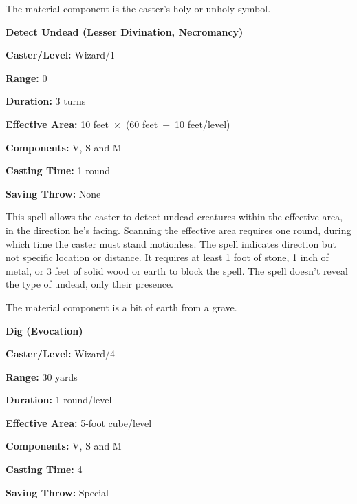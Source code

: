 \begin{multicols}{2}
The material component is the caster's holy or unholy symbol.

\columnbreak

\vspace{1em}

\noindent
\begin{minipage}{\columnwidth}

\noindent \textbf{Detect Undead (Lesser Divination, Necromancy)}

\noindent \textbf{Caster/Level:} Wizard/1

\noindent \textbf{Range:} 0

\noindent \textbf{Duration:} 3 turns

\noindent \textbf{Effective Area:} 10 feet~$\times$~(60 feet~+~10 feet/level)

\noindent \textbf{Components:} V, S and M

\noindent \textbf{Casting Time:} 1 round

\noindent \textbf{Saving Throw:} None

\end{minipage}

This spell allows the caster to detect undead creatures within the effective area, in the direction he's facing.  Scanning the effective area requires one round, during which time the caster must stand motionless.  The spell indicates direction but not specific location or distance.  It requires at least 1 foot of stone, 1 inch of metal, or 3 feet of solid wood or earth to block the spell.  The spell doesn't reveal the type of undead, only their presence.  

The material component is a bit of earth from a grave.

\vspace{1em}

\noindent
\begin{minipage}{\columnwidth}

\noindent \textbf{Dig (Evocation)}

\noindent \textbf{Caster/Level:} Wizard/4

\noindent \textbf{Range:} 30 yards

\noindent \textbf{Duration:} 1 round/level

\noindent \textbf{Effective Area:} 5-foot cube/level

\noindent \textbf{Components:} V, S and M

\noindent \textbf{Casting Time:} 4

\noindent \textbf{Saving Throw:} Special


\end{minipage}
\end{multicols}
